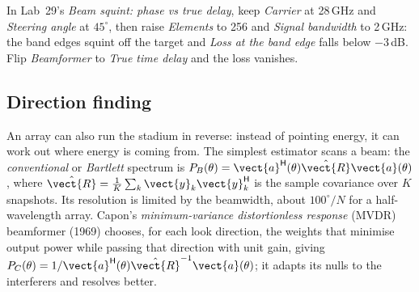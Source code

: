 \begin{tryit}
In Lab~29's \emph{Beam squint: phase vs true delay}, keep \emph{Carrier} at 28\,GHz and
\emph{Steering angle} at $45^\circ$, then raise \emph{Elements} to 256 and \emph{Signal bandwidth} to
2\,GHz: the band edges squint off the target and \emph{Loss at the band edge} falls below
$-3$\,dB. Flip \emph{Beamformer} to \emph{True time delay} and the loss vanishes.
\end{tryit}


\subsection{Direction finding}

An array can also run the stadium in reverse: instead of pointing energy, it can work out where
energy is coming from. The simplest estimator scans a beam: the \emph{conventional} or
\emph{Bartlett} spectrum is $P_B(\theta)=\vect{a}^{\mathsf H}(\theta)\hat{\vect{R}}\vect{a}(\theta)$,
where $\hat{\vect{R}}=\frac1K\sum_k\vect{y}_k\vect{y}_k^{\mathsf H}$ is the sample covariance over $K$
snapshots. Its resolution is limited by the beamwidth, about $100^\circ/N$ for a half-wavelength
array. Capon's \emph{minimum-variance distortionless response} (MVDR) beamformer (1969) chooses, for
each look direction, the weights that minimise output power while passing that direction with unit
gain, giving $P_C(\theta)=1/\vect{a}^{\mathsf H}(\theta)\hat{\vect{R}}^{-1}\vect{a}(\theta)$; it
adapts its nulls to the interferers and resolves better.

